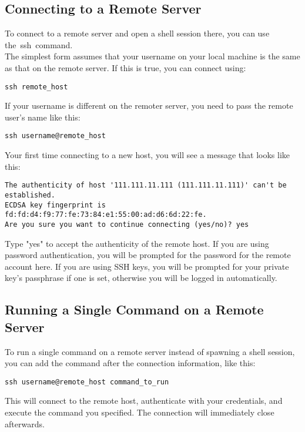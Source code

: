 \documentclass[12pt]{report}
\begin{document}
\subsection{Connecting to a Remote Server}
To connect to a remote server and open a shell session there, you can use the ssh command.\\
The simplest form assumes that your username on your local machine is the same as that on the remote server. If this is true, you can connect using:
\begin{lstlisting} 
ssh remote_host
\end{lstlisting} 
If your username is different on the remoter server, you need to pass the remote user's name like this:
\begin{lstlisting} 
ssh username@remote_host
\end{lstlisting} 
Your first time connecting to a new host, you will see a message that looks like this:
\begin{lstlisting} 
The authenticity of host '111.111.11.111 (111.111.11.111)' can't be established.
ECDSA key fingerprint is fd:fd:d4:f9:77:fe:73:84:e1:55:00:ad:d6:6d:22:fe.
Are you sure you want to continue connecting (yes/no)? yes
\end{lstlisting} 
Type "yes" to accept the authenticity of the remote host.
If you are using password authentication, you will be prompted for the password for the remote account here. If you are using SSH keys, you will be prompted for your private key's passphrase if one is set, otherwise you will be logged in automatically.

\subsection{Running a Single Command on a Remote Server}
To run a single command on a remote server instead of spawning a shell session, you can add the command after the connection information, like this:
\begin{lstlisting} 
ssh username@remote_host command_to_run
\end{lstlisting} 
This will connect to the remote host, authenticate with your credentials, and execute the command you specified. The connection will immediately close afterwards.
\end{document}
